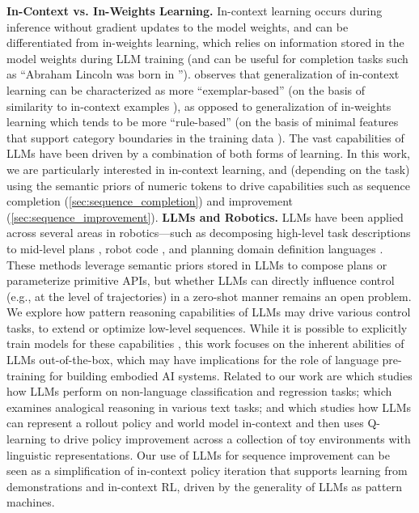 \documentclass{article}
\newcommand{\eg}{e.g., }
\begin{document}
\textbf{In-Context vs. In-Weights Learning.} In-context learning occurs during inference without gradient updates to the model weights, and can be differentiated from in-weights learning, which relies on information stored in the model weights during LLM training \cite{chan2022transformers} (and can be useful for completion tasks such as ``Abraham Lincoln was born in \underline{\hspace{1em}}''). \citet{chan2022transformers} observes that generalization of in-context learning can be characterized as more ``exemplar-based'' (on the basis of similarity to in-context examples \cite{shepard1963stimulus}), as opposed to generalization of in-weights learning which tends to be more ``rule-based'' (on the basis of minimal features that support category boundaries in the training data \cite{ashby1986varieties}). The vast capabilities of LLMs \cite{ brown2020language,ouyang2022training,chen2021evaluating,chowdhery2022palm,anil2023palm} have been driven by a combination of both forms of learning. In this work, we are particularly interested in in-context learning, and (depending on the task) using the semantic priors of numeric tokens to drive capabilities such as sequence completion (\cref{sec:sequence_completion}) and improvement (\cref{sec:sequence_improvement}).
\textbf{LLMs and Robotics.} LLMs have been applied across several areas in robotics---such as decomposing high-level task descriptions to mid-level plans \cite{ahn2022can, huang2022language, huang2022inner,zeng2022socratic,song2022llm,huang2023grounded}, robot code \cite{liang2022code,wu2023tidybot,singh2023progprompt,wang2023voyager}, and planning domain definition languages \cite{liu2023llm+}. These methods leverage semantic priors stored in LLMs to compose plans or parameterize primitive APIs, but whether LLMs can directly influence control (\eg at the level of trajectories) in a zero-shot manner remains an open problem. We explore how pattern reasoning capabilities of LLMs may drive various control tasks, to extend or optimize low-level sequences. While it is possible to explicitly train models for these capabilities \citep{laskin2022context, xu2022prompting, zhang2023motiongpt, lee2023supervised}, this work focuses on the inherent abilities of LLMs out-of-the-box, which may have implications for the role of language pre-training for building embodied AI systems.
Related to our work are \cite{dinh2022lift} which studies how LLMs perform on non-language classification and regression tasks; \cite{webb2023emergent} which examines analogical reasoning in various text tasks; and \cite{brooks2022context} which studies how LLMs can represent a rollout policy and world model in-context and then uses Q-learning to drive policy improvement across a collection of toy environments with linguistic representations. Our use of LLMs for sequence improvement can be seen as a simplification of in-context policy iteration that supports learning from demonstrations and in-context RL, driven by the generality of LLMs as pattern machines. 
\end{document}
